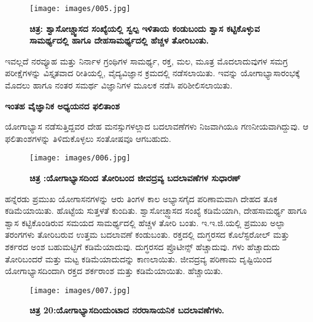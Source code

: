\begin{figure}
\texttt{[image: images/005.jpg]}
\caption{ \textbf{ಚಿತ್ರ:  ಶ್ವಾಸೋಚ್ಚ್ವಾಸದ ಸಂಖ್ಯೆಯಲ್ಲಿ ಸ್ವಲ್ಪ ಇಳಿತಾಯ ಕಂಡುಬಂದು ಶ್ವಾಸ ಕಟ್ಟಿಕೊಳ್ಳುವ ಸಾಮರ್ಥ್ಯದಲ್ಲಿ ಹಾಗೂ ದೇಹಸಾಮರ್ಥ್ಯದಲ್ಲಿ ಹೆಚ್ಚಳ ತೋರಿಬಂತು.} }
\end{figure}

ಇವಲ್ಲದೆ ನರವ್ಯೂಹ ಮತ್ತು ನಿರ್ನಾಳ ಗ್ರಂಥಿಗಳ ಸಾಮರ್ಥ್ಯ, ರಕ್ತ, ಮಲ, ಮೂತ್ರ ಮೊದಲಾದುವುಗಳ ಸಮಗ್ರ ಪರೀಕ್ಷೆಗಳನ್ನು ವಿಸ್ತೃತವಾದ ರೀತಿಯಲ್ಲಿ, ವೈದ್ಯವಿಜ್ಞಾನ ಕ್ರಮದಲ್ಲಿ ನಡೆಸಲಾಯಿತು. ಇವನ್ನು ಯೋಗಾಭ್ಯಾಸಾರಂಭಕ್ಕೆ ಮೊದಲು ಹಾಗೂ ನಂತರ ಸಮರ್ಥ ವಿಜ್ಞಾನಿಗಳ ಮೂಲಕ ನಡೆಸಿ ಪರಿಶೀಲಿಸಲಾಯಿತು.

\textbf{ಇಂತಹ ವೈಜ್ಞಾನಿಕ ಅಧ್ಯಯನದ ಫಲಿತಾಂಶ}

ಯೋಗಾಭ್ಯಾಸ ನಡೆಸುತ್ತಿದ್ದವರ ದೇಹ ಮನಸ್ಸುಗಳಲ್ಲಾದ ಬದಲಾವಣೆಗಳು ನಿಜವಾಗಿಯೂ ಗಣನೀಯವಾಗಿದ್ದುವು. ಆ ಫಲಿತಾಂಶಗಳನ್ನು ತಿಳಿದುಕೊಳ್ಳಲು ಸಂತೋಷವೂ ಆಗಬಹುದು.

\begin{figure}
\texttt{[image: images/006.jpg]}
\caption{ \textbf{ಚಿತ್ರ :ಯೋಗಾಭ್ಯಾಸದಿಂದ ತೋರಿಬಂದ ಜೀವದ್ರವ್ಯ ಬದಲಾವಣೆಗಳ ಸುಧಾರಣ್} }
\end{figure}

ಹನ್ನೆರಡು ಪ್ರಮುಖ ಯೋಗಾಸನಗಳನ್ನು ಆರು ತಿಂಗಳ ಕಾಲ ಅಭ್ಯಾಸಗೈದ ಪರಿಣಾಮವಾಗಿ ದೇಹದ ತೂಕ ಕಡಿಮೆಯಾಯಿತು. ಹೊಟ್ಟೆಯ ಸುತ್ತಳತೆ ಕುಂದಿತು. ಶ್ವಾಸೋಚ್ಛ್ವಾಸದ ಸಂಖ್ಯೆ ಕಡಿಮೆಯಾಗಿ, ದೇಹಸಾಮರ್ಥ್ಯ ಹಾಗೂ ಶ್ವಾಸ ಕಟ್ಟಿಕೊಂಡಿರುವ ಸಮಯದ ಸಾಮರ್ಥ್ಯದಲ್ಲಿ ಹೆಚ್ಚಳ ತೋರಿ ಬಂತು. ಇ.ಇ.ಜಿ.ಯಲ್ಲಿ ಪ್ರಮುಖ ಅಲ್ಫಾ ತರಂಗಗಳು ತೋರಿಬರುವ ಉತ್ತಮ ಬದಲಾವಣೆ ಕಂಡುಬಂತು. ರಕ್ತದಲ್ಲಿ ದುಗ್ಧರಸದ ಕೊಲೆಸ್ಟರೋಲ್  ಮತ್ತು ಶರ್ಕರದ ಅಂಶ ಬಹುಮಟ್ಟಿಗೆ ಕಡಿಮೆಯಾದುವು. ದುಗ್ಧರಸದ ಪ್ರೊಟೀನ್ಸ್  ಹೆಚ್ಚಾದುವು.  ಗಳು ಹೆಚ್ಚಾದುದು ತೋರಿಬಂದರೆ  ಮತ್ತು  ಮಟ್ಟ  ಕಡಿಮೆಯಾದುದನ್ನು ಕಾಣಲಾಯಿತು. ಜೀವದ್ರವ್ಯ ಪರಿಣಾಮ ದೃಷ್ಟಿಯಿಂದ ಯೋಗಾಭ್ಯಾಸದಿಂದಾಗಿ ರಕ್ತದ ಶರ್ಕರಾಂಶ ಮತ್ತು  ಕಡಿಮೆಯಾಯಿತು.  ಹೆಚ್ಚಾಯಿತು.

\begin{center}
\end{center}


\begin{figure}
\texttt{[image: images/007.jpg]}
\caption{ \textbf{ಚಿತ್ರ 20:ಯೋಗಾಭ್ಯಾಸದಿಂದುಂಟಾದ ನರರಾಸಾಯನಿಕ ಬದಲಾವಣೆಗಳು.} }
\end{figure}

\begin{center}
\end{center}


